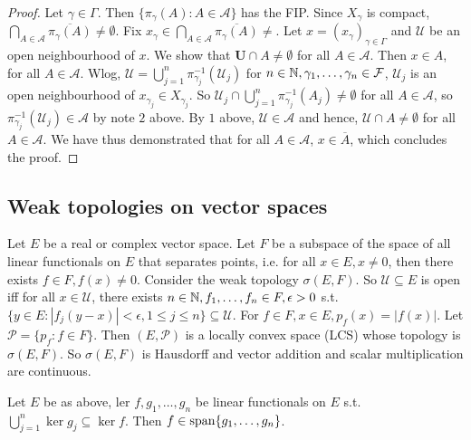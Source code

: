 \documentclass{article}
\begin{document}
\begin{proof}
    Let $\gamma\in\Gamma$. Then $\{\pi_\gamma(A): A\in \mathcal{A}\}$ has the FIP. Since $X_\gamma$ is compact, $\displaystyle\bigcap_{A\in\mathcal{A}}\overline{\pi_\gamma(A)}\neq \emptyset$. Fix $x_\gamma\in\displaystyle\bigcap_{A\in\mathcal{A}}\overline{\pi_\gamma(A)}\neq$. Let $x = (x_\gamma)_{\gamma\in\Gamma}$ and $\mathcal{U}$ be an open neighbourhood of \noindent\underline{$x$}. We show that $\mathbf{U}\cap A\neq \emptyset$ for all $A\in\mathcal{A}$. Then $x\in A$, for all $A\in \mathcal{A}$. Wlog, $\mathcal{U}=\displaystyle\bigcup^n_{j=1}\pi^{-1}_{\gamma_j}(\mathcal{U}_j)$ for $n\in\mathbb{N}, \gamma_1,\dots, \gamma_n\in\mathcal{F}$, $\mathcal{U}_j$ is an open neighbourhood of $x_{\gamma_j}\in X_{\gamma_j}$. So $\mathcal{U}_j\cap \displaystyle\bigcup^n_{j=1}\pi^{-1}_{\gamma_j}(A_j)\neq \emptyset$ for all $A\in\mathcal{A}$, so $\pi^{-1}_{\gamma_j}(\mathcal{U}_j)\in\mathcal{A}$ by note $2$ above. By $1$ above, $\mathcal{U}\in \mathcal{A}$ and hence, $\mathcal{U}\cap A\neq \emptyset$ for all $A\in\mathcal{A}$. We have thus demonstrated that for all $A\in\mathcal{A}$, $x\in\overline{A}$, which concludes the proof.
\end{proof}

\subsection{Weak topologies on vector spaces}

Let $E$ be a real or complex vector space. Let $F$ be a subspace of the space of all linear functionals on $E$ that separates points, i.e. for all $x\in E, x\neq 0$, then there exists $f\in F, f(x)\neq 0$. Consider the weak topology $\sigma(E,F)$. So $\mathcal{U}\subseteq E$ is open iff for all $x\in\mathcal{U}$, there exists $n\in\mathbb{N}, f_1,\dots, f_n\in F, \epsilon>0$ s.t. $\{y\in E: |f_j(y-x)|<\epsilon, 1\leq j \leq n \}\subseteq \mathcal{U}$. For $f\in F, x\in E, p_f(x) = |f(x)|$. Let $\mathcal{P} = \{p_f:f\in F\}$. Then $(E, \mathcal{P})$ is a locally convex space (LCS) whose topology is $\sigma(E, F)$. So $\sigma(E, F)$ is Hausdorff and vector addition and scalar multiplication are continuous.\\

\begin{boxlemma}\label{lemma: kernel lemma}
Let $E$ be as above, ler $f, g_1, \dots, g_n$ be linear functionals on $E$ s.t. $\displaystyle\bigcup^n_{j=1}\ker g_j\subseteq\ker f$. Then $f\in\operatorname{span}\{g_1, \dots, g_n\}$. 
\end{boxlemma}
\end{document}
